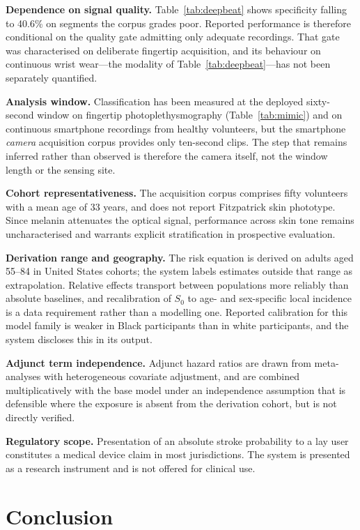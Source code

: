 \documentclass[conference]{IEEEtran}
\begin{document}
\textbf{Dependence on signal quality.} Table~\ref{tab:deepbeat} shows specificity falling
to 40.6\% on segments the corpus grades poor. Reported performance is therefore
conditional on the quality gate admitting only adequate recordings. That gate was
characterised on deliberate fingertip acquisition, and its behaviour on continuous wrist
wear---the modality of Table~\ref{tab:deepbeat}---has not been separately quantified.

\textbf{Analysis window.} Classification has been measured at the deployed sixty-second
window on fingertip photoplethysmography (Table~\ref{tab:mimic}) and on continuous
smartphone recordings from healthy volunteers, but the smartphone \emph{camera}
acquisition corpus provides only ten-second clips. The step that remains inferred rather
than observed is therefore the camera itself, not the window length or the sensing
site.

\textbf{Cohort representativeness.} The acquisition corpus comprises fifty
volunteers with a mean age of 33 years, and does not report Fitzpatrick skin
phototype. Since melanin attenuates the optical signal, performance across skin
tone remains uncharacterised and warrants explicit stratification in prospective
evaluation.

\textbf{Derivation range and geography.} The risk equation is derived on adults
aged 55--84 in United States cohorts; the system labels estimates outside that
range as extrapolation. Relative effects transport between populations more
reliably than absolute baselines, and recalibration of $S_0$ to age- and
sex-specific local incidence is a data requirement rather than a modelling one.
Reported calibration for this model family is weaker in Black participants than in
white participants, and the system discloses this in its output.

\textbf{Adjunct term independence.} Adjunct hazard ratios are drawn from
meta-analyses with heterogeneous covariate adjustment, and are combined
multiplicatively with the base model under an independence assumption that is
defensible where the exposure is absent from the derivation cohort, but is not
directly verified.

\textbf{Regulatory scope.} Presentation of an absolute stroke probability to a lay
user constitutes a medical device claim in most jurisdictions. The system is
presented as a research instrument and is not offered for clinical use.

\section{Conclusion}
\end{document}
